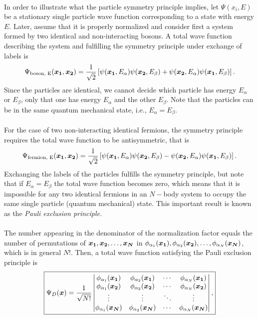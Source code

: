 \\
In order to illustrate what the particle symmetry principle implies, let $\Psi(x_i, E)$ be a stationary single particle wave function corresponding to a state with energy $E$. Later, assume that it is properly normalized and consider first a system formed by two identical and non-interacting bosons. A total wave function describing the system and fulfilling the symmetry principle under exchange of labels is
$$\Psi_{\text{boson, E}}(\boldsymbol{x_1}, \boldsymbol{x_2}) = \frac{1}{\sqrt{2}}\left[\psi(\boldsymbol{x_1}, E_\alpha)\psi(\boldsymbol{x_2}, E_\beta) + \psi(\boldsymbol{x_2}, E_\alpha)\psi(\boldsymbol{x_1}, E_\beta)\right].$$
Since the particles are identical, we cannot decide which particle has energy $E_\alpha$ or $E_\beta$, only that one has energy $E_\alpha$ and the other $E_\beta$. Note that the particles can be in the same quantum mechanical state, i.e., $E_\alpha = E_\beta$.\\
\\
For the case of two non-interacting identical fermions, the symmetry principle requires the total wave function to be antisymmetric, that is
\begin{equation}\label{twoElectronsWF}
 \Psi_{\text{fermion, E}}(\boldsymbol{x_1}, \boldsymbol{x_2}) = \frac{1}{\sqrt{2}}\left[\psi(\boldsymbol{x_1}, E_\alpha)\psi(\boldsymbol{x_2}, E_\beta) - \psi(\boldsymbol{x_2}, E_\alpha)\psi(\boldsymbol{x_1}, E_\beta)\right].
\end{equation}
Exchanging the labels of the particles fulfills the symmetry principle, but note that if $E_\alpha = E_\beta$ the total wave function becomes zero, which means that it is impossible for any two identical fermions in an $N-$body system to occupy the same single particle (quantum mechanical) state. This important result is known as the \emph{Pauli exclusion principle.}\\
\\
The number appearing in the denominator of the normalization factor equals the number of permutations of $\boldsymbol{x_1}, \boldsymbol{x_2},\ldots,\boldsymbol{x_N}$ in $\phi_{\alpha_1}(\boldsymbol{x_1}), \phi_{\alpha_2}(\boldsymbol{x_2}), \ldots, \phi_{\alpha_N}(\boldsymbol{x_N})$, which is in general $N!$. Then, a total wave function satisfying the Pauli exclusion principle is 
\begin{equation}\label{SlaterDeterminant}
\boxed{
\Psi_D(\boldsymbol{x}) = \frac{1}{\sqrt{N!}}
 \begin{vmatrix}
 \phi_{\alpha_1}(\boldsymbol{x_1}) & \phi_{\alpha_2}(\boldsymbol{x_1}) & \cdots & \phi_{\alpha_N}(\boldsymbol{x_1})\\
\phi_{\alpha_1}(\boldsymbol{x_2}) & \phi_{\alpha_2}(\boldsymbol{x_2}) & \cdots & \phi_{\alpha_N}(\boldsymbol{x_2})\\
\vdots  & \vdots & \ddots & \vdots  \\
\phi_{\alpha_1}(\boldsymbol{x_N}) & \phi_{\alpha_2}(\boldsymbol{x_N}) & \cdots & \phi_{\alpha_N}(\boldsymbol{x_N})  
 \end{vmatrix},}
\end{equation}
